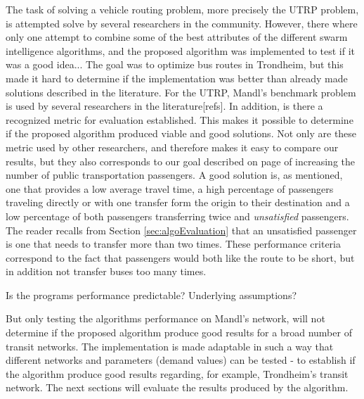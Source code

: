 
The task of solving a vehicle routing problem, more precisely the UTRP problem, is attempted solve by several researchers in the community. However, there where only one attempt to combine some of the best attributes of the different swarm intelligence algorithms, and the proposed algorithm was implemented to test if it was a good idea... The goal was to optimize bus routes in Trondheim, but this made it hard to determine if the implementation was better than already made solutions described in the literature. For the UTRP, Mandl's benchmark problem is used by several researchers in the literature[refs]. In addition, is there a recognized metric for evaluation established. This makes it possible to determine if the proposed algorithm produced viable and good solutions. Not only are these metric used by other researchers, and therefore makes it easy to compare our results, but they also corresponds to our goal described on page \pageref{itm:goal} of increasing the number of public transportation passengers. A good solution is, as mentioned, one that provides a low average travel time, a high percentage of passengers traveling directly or with one transfer form the origin to their destination and a low percentage of both passengers transferring twice and \textit{unsatisfied} passengers. The reader recalls from Section \vref{sec:algoEvaluation} that an unsatisfied passenger is one that needs to transfer more than two times. These performance criteria correspond to the fact that passengers would both like the route to be short, but in addition not transfer buses too many times.

Is the programs performance predictable? Underlying assumptions?

But only testing the algorithms performance on Mandl's network, will not determine if the proposed algorithm produce good results for a broad number of transit networks. The implementation is made adaptable in such a way that different networks and parameters (demand values) can be tested - to establish if the algorithm produce good results regarding, for example, Trondheim's transit network. The next sections will evaluate the results produced by the algorithm. 